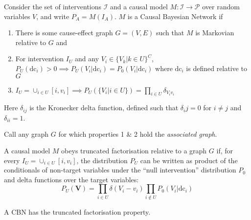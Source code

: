 \begin{definition}
Consider the set of interventions $\mathcal{I}$ and a causal model $M:\mathcal{I}\to\mathcal{P}$ over random variables $V$, and write $P_A=M(I_A)$. $M$ is a Causal Bayesian Network if
\begin{enumerate}
    \item There is some cause-effect graph $G=(V,E)$ such that $M$ is Markovian relative to $G$ and
    \item For intervention $I_U$ and any $V_i \in \{V_k|k\in U\}^C$, $P_U(\mathrm{dc}_i) > 0 \implies P_U(V_i|\mathrm{dc}_i) = P_0(V_i|\mathrm{dc}_i)$ where $\mathrm{dc}_i$ is defined relative to $G$
    \item $I_U = \cup_{i\in U}[i,v_i] \implies P_U(\{V_i|i\in U\}) = \prod_{i\in U} \delta_{V_iv_i}$
\end{enumerate}
Here $\delta_{ij}$ is the Kronecker delta function, defined such that $\delta_ij=0$ for $i\neq j$ and $\delta_{ii} = 1$.

Call any graph $G$ for which properties 1 \& 2 hold the \emph{associated graph}.
\end{definition}

\begin{definition}
A causal model $M$ obeys truncated factorisation relative to a graph $G$ if, for every $I_U=\cup_{i\in U} [i,v_i]$, the distribution $P_U$ can be written as product of the conditionals of non-target variables under the ``null intervention'' distribution $P_0$ and delta functions over the target variables:
\[P_U(\mathbf{V}) = \prod_{i\in U} \delta (V_i-v_i)\prod_{i\not\in U} P_0(V_i|\mathrm{dc}_i) \]
\end{definition}

\begin{theorem}
A CBN has the truncated factorisation property.
\end{theorem}


